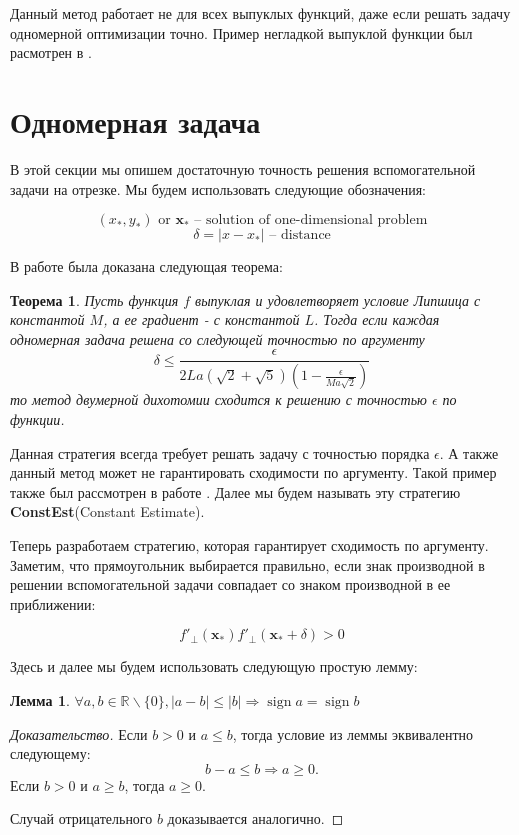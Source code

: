 \documentclass[12pt]{article}
\newtheorem{theorem}{Теорема}[section]
\newtheorem{lemma}{Лемма}[section]
\DeclareMathOperator{\sign}{sign}
\begin{document}
Данный метод работает не для всех выпуклых функций, даже если решать задачу одномерной оптимизации точно. Пример негладкой выпуклой функции был расмотрен в \cite{Ston_Pas}.

\section{Одномерная задача}
\label{Delta}

В этой секции мы опишем достаточную точность решения вспомогательной задачи на отрезке. Мы будем использовать следующие обозначения:

$$(x_*,y_*) \text{ or }\textbf{x}_*\text{ -- solution of one-dimensional problem} $$
$$\delta = |x-x_*| \text{ -- distance}$$

В работе \cite{Ston_Pas} была доказана следующая теорема:

\begin{theorem}
\label{ConstEst}
Пусть функция $f$ выпуклая и удовлетворяет условие Липшица с константой $M$, а ее градиент - с константой $L$.
Тогда если каждая одномерная задача решена со следующей точностью по аргументу
\begin{equation}
\delta \leq \frac{\epsilon}{2La(\sqrt{2}+\sqrt{5})(1-\frac{\epsilon}{Ma\sqrt{2}})}
\end{equation}
то метод двумерной дихотомии сходится к решению с точностью $\epsilon$ по функции.
\end{theorem}

Данная стратегия всегда требует решать задачу с точностью порядка $\epsilon$. А также данный метод может не гарантировать сходимости по аргументу. Такой пример также был рассмотрен в работе \cite{Ston_Pas}. Далее мы будем называть эту стратегию \textbf{ConstEst}(Constant Estimate).

Теперь разработаем стратегию, которая гарантирует сходимость по аргументу. Заметим, что прямоугольник выбирается правильно, если знак производной в решении вспомогательной задачи совпадает со знаком производной в ее приближении:

\begin{equation}\label{MCH}
f'_\perp(\textbf{x}_*)f'_\perp(\textbf{x}_*+\delta) > 0
\end{equation}

Здесь и далее мы будем использовать следующую простую лемму:

\begin{lemma}
\label{trick_lemma}
$\forall a,b\in\mathbb{R}\backslash\{0\}, |a-b|\leq |b| \Rightarrow \sign a = \sign b$
\end{lemma}
\begin{proof}[Доказательство]
Если $b>0$ и $a\leq b$, тогда условие из леммы эквивалентно следующему:
$$b-a\leq b\Rightarrow a\geq 0.$$
Если $b>0$ и $a \geq b$, тогда $a\geq 0$.

Случай отрицательного $b$ доказывается аналогично.
\end{proof}
\end{document}
